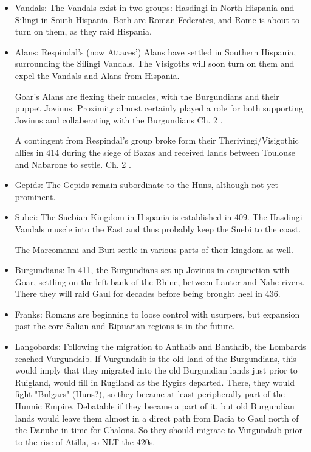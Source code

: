 \documentclass{article}
\newcommand{\specificCite}[1]{\tiny #1 \normalsize}
\begin{document}
\begin{itemize}
		\item Vandals:\newline
		The Vandals exist in two groups:  Hasdingi in North Hispania and Silingi in South Hispania.
		Both are Roman Federates, and Rome is about to turn on them, as they raid Hispania.
		
		\item Alans:\newline
		Respindal's (now Attaces') Alans have settled in Southern Hispania, surrounding the Silingi Vandals.
		The Visigoths will soon turn on them and expel the Vandals and Alans from Hispania.
		
		Goar's Alans are flexing their muscles, with the Burgundians and their puppet Jovinus.
		Proximity almost certainly played a role for both supporting Jovinus and collaberating with the Burgundians \cite{BachrachAlans}\specificCite{Ch. 2}.
		
		A contingent from Respindal's group broke form their Therivingi/Visigothic allies in 414 during the siege of Bazas and received lands between Toulouse and Nabarone to settle. \cite{BachrachAlans}\specificCite{Ch. 2}.
		
		\item Gepids:\newline
		The Gepids remain subordinate to the Huns, although not yet prominent.
		
		\item Subei:\newline
		The Suebian Kingdom in Hispania is established in 409.
		The Hasdingi Vandals muscle into the East and thus probably keep the Suebi to the coast.
		
		The Marcomanni and Buri settle in various parts of their kingdom as well.
		
		\item Burgundians:\newline
		In 411, the Burgundians set up Jovinus in conjunction with Goar, settling on the left bank of the Rhine, between Lauter and Nahe rivers.
		There they will raid Gaul for decades before being brought heel in 436.
		
		\item Franks:\newline
		Romans are beginning to loose control with usurpers, but expansion past the core Salian and Ripuarian regions is in the future.
		
		\item Langobards:\newline
		Following the migration to Anthaib and Banthaib, the Lombards reached Vurgundaib.
		If Vurgundaib is the old land of the Burgundians, this would imply that they migrated into the old Burgundian lands just prior to Ruigland, would fill in Rugiland as the Rygirs departed.
		There, they would fight "Bulgars" (Huns?), so they became at least peripherally part of the Hunnic Empire.
		Debatable if they became a part of it, but old Burgundian lands would leave them almost in a direct path from Dacia to Gaul north of the Danube in time for Chalons.
		So they should migrate to Vurgundaib prior to the rise of Atilla, so NLT the 420s.
		

\end{itemize}
\end{document}

